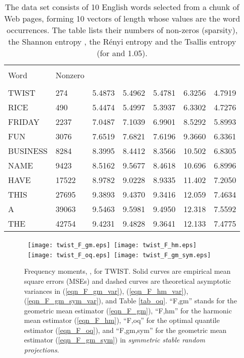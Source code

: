 \documentclass{sig-alternate}
\begin{document}
\begin{table}[h]
\caption{\small  The data set consists of 10 English words selected from a chunk of  Web pages, forming 10 vectors of length  whose values are the word occurrences. The table lists their numbers of non-zeros (sparsity), the Shannon entropy , the R\'enyi entropy  and the Tsallis entropy  (for  and 1.05).
 }
\begin{center}{\scriptsize\tiny
\begin{tabular}{l l l l l l l}
\hline \hline\\
Word &Nonzero  &  &  &   &  & \\  \\\hline
TWIST &274 &5.4873 &5.4962 &5.4781 &6.3256 &4.7919\\
RICE &490 &5.4474 &5.4997 &5.3937 &6.3302 &4.7276\\
FRIDAY &2237 &7.0487 &7.1039 &6.9901 &8.5292 &5.8993 \\
FUN &3076 & 7.6519   & 7.6821 &    7.6196  &   9.3660  &   6.3361\\
BUSINESS &8284 &8.3995 &8.4412 &8.3566 &10.502 &6.8305\\
NAME & 9423 &8.5162 &9.5677 &8.4618 &10.696 &6.8996\\
HAVE & 17522  &8.9782 &9.0228 & 8.9335 & 11.402 & 7.2050\\
THIS & 27695  &9.3893 &9.4370 &9.3416 &12.059 &7.4634 \\
A    & 39063  &9.5463  &9.5981  &9.4950  &12.318   &7.5592\\
THE  & 42754  & 9.4231 &9.4828  &9.3641  &12.133  &7.4775\\
\hline\hline
\end{tabular}
}
\end{center}
\label{tab_data}
\end{table}
\begin{figure}[h]
\begin{center}\mbox{
{\texttt{[image: twist\_F\_gm.eps]}} \hspace{-0.1in}
{\texttt{[image: twist\_F\_hm.eps]}}}\\\mbox{
{\texttt{[image: twist\_F\_oq.eps]}} \hspace{-0.1in}
{\texttt{[image: twist\_F\_gm\_sym.eps]}}
}
\end{center}
\vspace{-0.15in}
\caption{Frequency moments, , for TWIST.  Solid curves are   empirical mean square errors (MSEs) and dashed curves are theoretical asymptotic variances in (\ref{eqn_F_gm_var}), (\ref{eqn_F_hm_var}), (\ref{eqn_F_gm_sym_var}), and Table \ref{tab_oq}.  ``F,gm'' stands for the geometric mean estimator   (\ref{eqn_F_gm}), ``F,hm'' for the harmonic mean estimator    (\ref{eqn_F_hm}), ``F,oq'' for the optimal quantile estimator  (\ref{eqn_F_oq}), and ``F,gm,sym'' for the geometric mean estimator  (\ref{eqn_F_gm_sym}) in {\em symmetric stable random projections}. }\label{fig_twist_F}
\end{figure}
\end{document}
